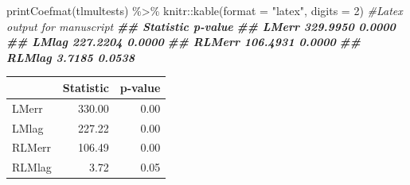 \documentclass[10pt,landscape,a3paper]{article}
\newenvironment{Shaded}{\begin{snugshade}}{\end{snugshade}}
\newcommand{\AttributeTok}[1]{\textcolor[rgb]{0.77,0.63,0.00}{#1}}
\newcommand{\CommentTok}[1]{\textcolor[rgb]{0.56,0.35,0.01}{\textit{#1}}}
\newcommand{\DecValTok}[1]{\textcolor[rgb]{0.00,0.00,0.81}{#1}}
\newcommand{\DocumentationTok}[1]{\textcolor[rgb]{0.56,0.35,0.01}{\textbf{\textit{#1}}}}
\newcommand{\FunctionTok}[1]{\textcolor[rgb]{0.00,0.00,0.00}{#1}}
\newcommand{\NormalTok}[1]{#1}
\newcommand{\SpecialCharTok}[1]{\textcolor[rgb]{0.00,0.00,0.00}{#1}}
\newcommand{\StringTok}[1]{\textcolor[rgb]{0.31,0.60,0.02}{#1}}
\begin{document}
\begin{Shaded}
\begin{Highlighting}[]
\FunctionTok{printCoefmat}\NormalTok{(tlmultests) }\SpecialCharTok{\%\textgreater{}\%}
\NormalTok{    knitr}\SpecialCharTok{::}\FunctionTok{kable}\NormalTok{(}\AttributeTok{format =} \StringTok{"latex"}\NormalTok{, }\AttributeTok{digits =} \DecValTok{2}\NormalTok{)  }\CommentTok{\#Latex output for manuscript}
\DocumentationTok{\#\#        Statistic p{-}value}
\DocumentationTok{\#\# LMerr   329.9950  0.0000}
\DocumentationTok{\#\# LMlag   227.2204  0.0000}
\DocumentationTok{\#\# RLMerr  106.4931  0.0000}
\DocumentationTok{\#\# RLMlag    3.7185  0.0538}
\end{Highlighting}
\end{Shaded}

\begin{tabular}{l|r|r}
\hline
  & Statistic & p-value\\
\hline
LMerr & 330.00 & 0.00\\
\hline
LMlag & 227.22 & 0.00\\
\hline
RLMerr & 106.49 & 0.00\\
\hline
RLMlag & 3.72 & 0.05\\
\hline
\end{tabular}
\end{document}
